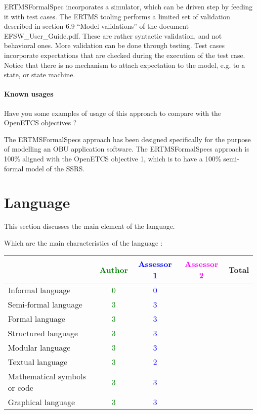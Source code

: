 \begin{assessor1}
ERTMSFormalSpec incorporates a simulator, which can be driven step by feeding it with test cases. 
The ERTMS tooling performs a limited set of validation described in section 6.9 "`Model validations"' of the document EFSW\_User\_Guide.pdf. These are rather syntactic validation, and not behavioral ones. More validation can be done through testing. Test cases incorporate expectations that are checked during the execution of the test case. Notice that there is no mechanism to attach expectation to the model, e.g. to a state, or state machine.
\end{assessor1}

\paragraph{Known usages} Have you some examples of usage of this approach to compare with the OpenETCS objectives ?

\begin{author_comment}
The ERTMSFormalSpecs approach has been designed specifically for the purpose of modelling an OBU application software. The ERTMSFormalSpecs approach is 100\% aligned with the OpenETCS objective 1, which is to have a 100\% semi-formal model of the SSRS. 
\end{author_comment}

\section{Language}
This section discusses the main element of the language.

Which are the main characteristics of the language :

\begin{tabular}{|l | c | c | c | c|}
\hline
& \textcolor{green}{Author} & \textcolor{blue}{Assessor 1} & \textcolor{magenta}{Assessor 2} & Total \\
\hline 
Informal language & \textcolor{green}{0} & \textcolor{blue}{0} & &  \\
\hline 
Semi-formal language & \textcolor{green}{3} & \textcolor{blue}{3} & &  \\
\hline
Formal language & \textcolor{green}{3} & \textcolor{blue}{3} & &  \\
\hline
Structured language & \textcolor{green}{3} & \textcolor{blue}{3} & & \\
\hline
Modular language & \textcolor{green}{3} & \textcolor{blue}{3} & & \\
\hline
Textual language & \textcolor{green}{3} & \textcolor{blue}{2} & & \\
\hline
Mathematical symbols or code & \textcolor{green}{3} & \textcolor{blue}{3} & & \\
\hline
Graphical language & \textcolor{green}{3} & \textcolor{blue}{3} & & \\
\hline
\end{tabular}

